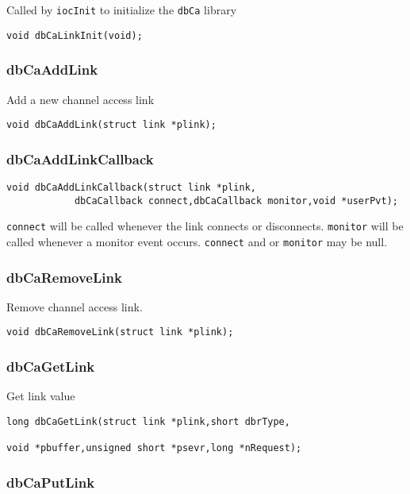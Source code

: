 Called by \verb|iocInit| to initialize the \verb|dbCa| library

\begin{verbatim}void dbCaLinkInit(void);
\end{verbatim}\subsubsection{dbCaAddLink}

Add a new channel access link

\begin{verbatim}void dbCaAddLink(struct link *plink);
\end{verbatim}\subsubsection{dbCaAddLinkCallback}

\begin{verbatim}void dbCaAddLinkCallback(struct link *plink,
            dbCaCallback connect,dbCaCallback monitor,void *userPvt);
\end{verbatim}\verb|connect| will be called whenever the link connects or disconnects. \verb|monitor| will be called whenever a monitor event 
occurs. \verb|connect| and or \verb|monitor| may be null.

\subsubsection{dbCaRemoveLink}

Remove channel access link.

\begin{verbatim}void dbCaRemoveLink(struct link *plink);
\end{verbatim}\subsubsection{dbCaGetLink}

Get link value

\begin{verbatim}long dbCaGetLink(struct link *plink,short dbrType,

void *pbuffer,unsigned short *psevr,long *nRequest);
\end{verbatim}\subsubsection{dbCaPutLink}

